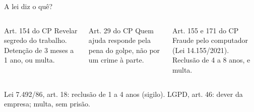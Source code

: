 \begin{frame}{A lei diz o quê?}
  \begin{columns}[t,onlytextwidth]
    \begin{cefetblock}{Art. 154 do CP}
      \scriptsize
      Revelar segredo do trabalho.
      Detenção de 3 meses a 1 ano, ou multa.
    \end{cefetblock}
    \begin{cefetblock}{Art. 29 do CP}
      \scriptsize
      Quem ajuda responde pela pena do golpe, não por um crime à parte.
    \end{cefetblock}
    \begin{cefetalertblock}{Art. 155 e 171 do CP}
      \scriptsize
      Fraude pelo computador (Lei 14.155/2021).
      Reclusão de 4 a 8 anos, e multa.
    \end{cefetalertblock}
  \end{columns}
  \vspace{0.45em}
  {\scriptsize\color{cefetMuted}Lei 7.492/86, art. 18: reclusão de 1 a 4 anos (sigilo). LGPD, art. 46: dever da empresa; multa, sem prisão.\par}
\end{frame}
